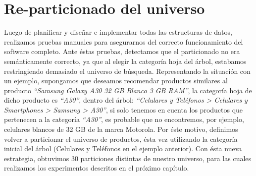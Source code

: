 \section{Re-particionado del universo}
Luego de planificar y diseñar e implementar todas las estructuras de datos, 
realizamos pruebas manuales para asegurarnos del correcto funcionamiento del 
software completo.
Ante \'estas pruebas, detectamos que el particionado no era sem\'anticamente 
correcto, ya que al elegir la categor\'ia hoja del \'arbol, estabamos 
restringiendo demasiado el universo de b\'usqueda. Representando la situaci\'on
 con un ejemplo, supongamos que deseamos recomendar productos similares al 
 producto \textit{“Samsung Galaxy A30 32 GB Blanco 3 GB RAM”}, la categor\'ia 
 hoja de dicho producto es \textit{“A30”}, dentro del \'arbol: 
 \textit{“Celulares y Tel\'efonos > Celulares y Smartphones > Samsung > A30”}, 
 si solo tenemos en cuenta los productos que pertenecen a la categor\'ia 
 \textit{“A30”}, es probable que no encontremos, por ejemplo, celulares blancos
  de 32 GB de la marca Motorola.
Por \'este motivo, definimos volver a particionar el universo de productos, 
\'esta vez utilizando la categor\'ia inicial del \'arbol (Celulares y 
Tel\'efonos en el ejemplo anterior).
Con \'esta nueva estrategia, obtuvimos 30 particiones distintas de nuestro 
universo, para las cuales realizamos los experimentos descritos en el pr\'oximo
 cap\'itulo.
